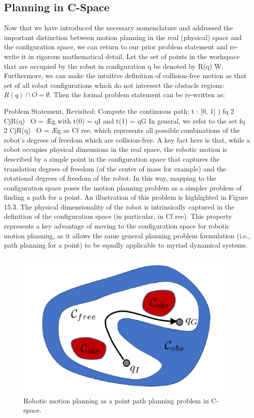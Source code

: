 \documentclass[twoside]{article}
\begin{document}
\subsection{ Planning in C-Space }
Now that we have introduced the necessary nomenclature and addressed the important distinction between motion planning in the real (physical) space and the configuration space, we can return to our prior problem statement and re-write it in rigorous mathematical detail. Let the set of points in the workspace that are occupied by the robot in configuration q be denoted by R(q) W. Furthermore, we can make the intuitive definition of collision-free motion as that set of all robot configurations which do not intersect the obstacle regions: $R(q)\cap O = \emptyset$. Then the formal problem statement can be re-written as: 

Problem Statement, Revisited:
Compute the continuous path: t : [0, 1] ) fq 2 CjR(q) \ O = Æg with t(0) = qI and t(1) = qG In general, we refer to the set fq 2 CjR(q) \ O = Æg as Cf ree, which represents all possible combinations of the robot’s degrees of freedom which are collision-free. A key fact here is that, while a robot occupies physical dimensions in the real space, the robotic motion is described by a simple point in the configuration space that captures the translation degrees of freedom (of the center of mass for example) and the rotational degrees of freedom of the robot. In this way, mapping to the configuration space poses the motion planning problem as a simpler problem of finding a path for a point. An illustration of this problem is highlighted in Figure 15.3. The physical dimensionality of the robot is intrinsically captured in the definition of the configuration space (in particular, in Cf ree). This property represents a key advantage
of moving to the configuration space for robotic motion planning, as it allows the same general planning problem formulation (i.e., path planning for a point) to be equally applicable to myriad dynamical systems.

\begin{figure}[H]
\begin{center}
\includegraphics{fig15_3.PNG}
\caption{Robotic motion planning as a point path planning problem in C-space.}
\end{center}
\end{figure}
\end{document}
